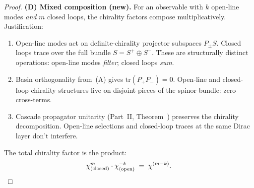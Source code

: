 \documentclass[12pt,a4paper]{article}
\begin{document}
\begin{proof}
\textbf{(D) Mixed composition (new).} For an observable with $k$ open-line modes \emph{and} $m$ closed loops, the chirality factors compose multiplicatively. Justification:
\begin{enumerate}[label=(\roman*),nosep]
\item Open-line modes act on definite-chirality projector subspaces $P_\pm S$. Closed loops trace over the full bundle $S = S^+\oplus S^-$. These are structurally distinct operations: open-line modes \emph{filter}; closed loops \emph{sum}.
\item Basin orthogonality from~(A) gives $\mathrm{tr}(P_+ P_-) = 0$. Open-line and closed-loop chirality structures live on disjoint pieces of the spinor bundle: zero cross-terms.
\item Cascade propagator unitarity (Part~II, Theorem~) preserves the chirality decomposition. Open-line selections and closed-loop traces at the same Dirac layer don't interfere.
\end{enumerate}
The total chirality factor is the product:
\[
\chi^{m}_{(\text{closed})} \cdot \chi^{-k}_{(\text{open})} \;=\; \chi^{(m - k)}. \qedhere
\]
\end{proof}
\end{document}
